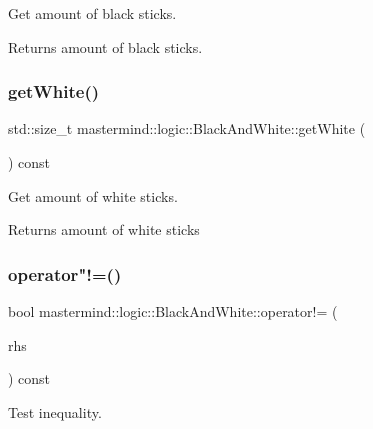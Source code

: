 Get amount of black sticks. 

\begin{DoxyReturn}{Returns}
amount of black sticks. 
\end{DoxyReturn}
\hypertarget{classmastermind_1_1logic_1_1_black_and_white_a85a1deac6d5cae64adce52aee8604fb0}{}\label{classmastermind_1_1logic_1_1_black_and_white_a85a1deac6d5cae64adce52aee8604fb0} 
\subsubsection{\texorpdfstring{get\+White()}{getWhite()}}
{\footnotesize\ttfamily std\+::size\+\_\+t mastermind\+::logic\+::\+Black\+And\+White\+::get\+White (\begin{DoxyParamCaption}{ }\end{DoxyParamCaption}) const}



Get amount of white sticks. 

\begin{DoxyReturn}{Returns}
amount of white sticks 
\end{DoxyReturn}
\hypertarget{classmastermind_1_1logic_1_1_black_and_white_a8d622959805faeb3f63b0342667b58f7}{}\label{classmastermind_1_1logic_1_1_black_and_white_a8d622959805faeb3f63b0342667b58f7} 
\subsubsection{\texorpdfstring{operator"!=()}{operator!=()}}
{\footnotesize\ttfamily bool mastermind\+::logic\+::\+Black\+And\+White\+::operator!= (\begin{DoxyParamCaption}\item[{const \hyperlink{classmastermind_1_1logic_1_1_black_and_white}{Black\+And\+White} \&}]{rhs }\end{DoxyParamCaption}) const}



Test inequality. 


